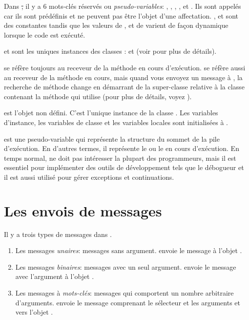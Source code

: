 \documentclass[a4paper,10pt,twoside]{book}
\begin{document}
Dans \st, il y a 6 mots-cl\'{e}s r\'{e}serv\'{e}s ou  \emph{pseudo-variables}:
, ,  ,  ,
 et .
Ils sont appel\'{e}s  car ils sont pr\'{e}d\'{e}finis et ne peuvent pas \^{e}tre l'objet d'une affectation.
,  et  sont des constantes tandis que les valeurs de ,  et de  varient de fa\c{c}on dynamique lorsque le code est ex\'{e}cut\'{e}. 

 et  sont les uniques instances des classes
:  et  (voir  
pour plus de d\'{e}tails).

 se r\'{e}f\`{e}re toujours au receveur de la m\'{e}thode en cours d'ex\'{e}cution.
 se r\'{e}f\`{e}re aussi au receveur de la m\'{e}thode en
cours, mais quand vous envoyez un message \`{a} \super, la recherche
de m\'{e}thode change en d\'{e}marrant de la super-classe relative \`{a} la classe contenant la m\'{e}thode qui utilise 
(pour plus de d\'{e}tails, voyez ).

 est l'objet non d\'{e}fini.
C'est l'unique instance de la classe . 
Les variables d'instance, les variables de classe et les variables locales  sont initialis\'{e}es \`{a} .

 est une pseudo-variable qui repr\'{e}sente la structure du sommet de la pile d'ex\'{e}cution.
En d'autres termes, il repr\'{e}sente le  ou le  en cours d'ex\'{e}cution.
En temps normal,  ne doit pas intéresser la plupart
des programmeurs, mais il est essentiel pour impl\'{e}menter des
outils de d\'{e}veloppement tels que le débogueur et il est aussi utilis\'{e} pour g\'{e}rer exceptions et continuations.

\section{Les envois de messages}

Il y a trois types de messages dans \pharo.
\begin{enumerate}
  \item Les messages \emph{unaires}: messages sans argument.
   envoie le message   \`{a} l'objet .
  \item Les messages \emph{binaires}: messages avec un seul argument.
  	 envoie le message \ct{+} avec l'argument  \`{a} l'objet .
  \item Les messages \`{a} \emph{mots-cl\'{e}s}: messages qui comportent un nombre arbitraire d'arguments.
  	 envoie le message comprenant le s\'{e}lecteur 	 et les arguments  et  vers l'objet .
\end{enumerate}
\end{document}
